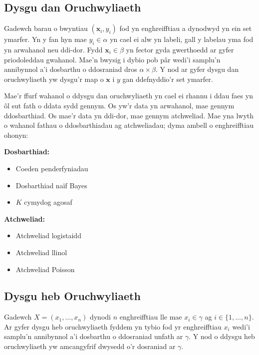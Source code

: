 \subsection{Dysgu dan Oruchwyliaeth}

Gadewch barau o bwyntiau $(\mathbf{x}_{i},y_{i})$ fod yn enghreifftiau a dynodwyd yn ein set ymarfer. Yn y fan hyn mae $y_{i} \in \alpha$ yn cael ei alw yn labeli, gall y labelau yma fod yn arwahanol neu ddi-dor. Fydd $\mathbf{x}_{i} \in  \beta$ yn fector gyda gwerthoedd ar gyfer priodoleddau gwahanol. Mae'n bwysig i dybio pob p\^{a}r wedi'i samplu'n annibynnol a'i dosbarthu o ddosraniad dros $\alpha \times \beta$. Y nod ar gyfer dysgu dan oruchwyliaeth yw dysgu'r map o $\mathbf{x}$ i $y$ gan ddefnyddio'r set ymarfer. \cite{dysgu-peirianyddol}

Mae'r ffurf wahanol o ddysgu dan oruchwyliaeth yn cael ei rhannu i ddau faes yn \^{o}l sut fath o ddata sydd gennym. Os yw'r data yn arwahanol, mae gennym ddosbarthiad. Os mae'r data yn ddi-dor, mae gennym atchweliad. Mae yna lwyth o wahanol fathau o ddosbarthiadau ag atchweliadau; dyma ambell o enghreifftiau ohonyn:

\textbf{Dosbarthiad:}

\begin{itemize}
	\item Coeden penderfyniadau
	\item Dosbarthiad na\"{i}f Bayes 
	\item $K$ cymydog agosaf
\end{itemize} 

\textbf{Atchweliad:}

\begin{itemize}
	\item Atchweliad logistaidd
	\item Atchweliad llinol
	\item Atchweliad Poisson
\end{itemize}

\subsection{Dysgu heb Oruchwyliaeth}

Gadewch $ X = ( x_{1}, \dots, x_{n} ) $ dynodi $n$ enghreifftiau lle mae $x_{i} \in \gamma$ ag $i \in \{ 1, \dots, n \}$. Ar gyfer dysgu heb oruchwyliaeth fyddem yn tybio fod yr enghreifftiau $x_{i}$ wedi'i samplu'n annibynnol a'i dosbarthu o ddosraniad unfath ar $\gamma$. Y nod o ddysgu heb oruchwyliaeth yw amcangyfrif dwysedd o'r dosraniad ar $\gamma$. \cite{dysgu-peirianyddol}

